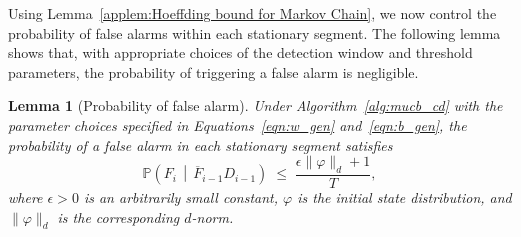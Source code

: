 \documentclass[twoside]{article}
\theoremstyle{plain}
\newtheorem{lemma}[theorem]{Lemma}
\theoremstyle{definition}
\theoremstyle{remark}
\begin{document}
Using Lemma~\ref{applem:Hoeffding bound for Markov Chain}, we now control the probability of false alarms within each stationary segment. 
The following lemma shows that, with appropriate choices of the detection window and threshold parameters, 
the probability of triggering a false alarm is negligible.

\begin{lemma}[Probability of false alarm]
    \label{applem:FA}
    Under Algorithm~\ref{alg:mucb_cd} with the parameter choices specified in Equations~\ref{eqn:w_gen} and~\ref{eqn:b_gen}, the probability of a false alarm in each stationary segment satisfies
    \begin{equation}    
        \mathbb{P}\!\left(F_i \,\middle|\, \overline{F}_{i-1} D_{i-1}\right)
        \;\leq\; \frac{\epsilon \lVert \varphi \rVert_{d} + 1}{T},
    \end{equation}
    where $\epsilon > 0$ is an arbitrarily small constant, $\varphi$ is the initial state distribution, and $\lVert \varphi \rVert_{d}$ is the corresponding $d$-norm.
\end{lemma}
\end{document}
